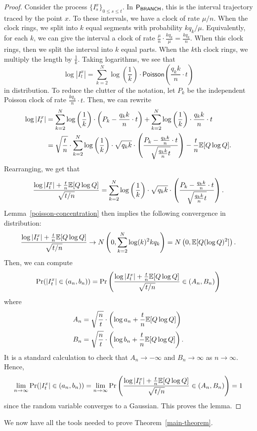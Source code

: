 \documentclass[12pt]{article}
\begin{document}
\begin{proof}
	Consider the process $\{I_s^x\}_{0 \leq s \leq t}$. In $\mathsf{P}_{\mathsf{BRANCH}}$, this is the interval trajectory traced by the point $x$. To these intervals, we have a clock of rate $\mu / n$. When the clock rings, we split into $k$ equal segments with probability $kq_k / \mu$. Equivalently, for each $k$, we can give the interval a clock of rate $\frac{\mu}{n} \cdot \frac{kq_k}{\mu} = \frac{kq_k}{n}$. When this clock rings, then we split the interval into $k$ equal parts. When the $k$th clock rings, we multiply the length by $\frac{1}{k}$. Taking logarithms, we see that 
	\[
		\log |I_t^x| = \sum_{k = 2}^N \log \left ( \frac{1}{k} \right ) \cdot \mathsf{Poisson} \left ( \frac{q_k k}{n} \cdot t \right )
	\]
	in distribution. To reduce the clutter of the notation, let $P_k$ be the independent Poisson clock of rate $\frac{k q_k}{n} \cdot t$. Then, we can rewrite 
	\begin{align*}
	\log |I_t^x| & = \sum_{k = 2}^N \log \left ( \frac{1}{k} \right ) \cdot \left ( P_k - \frac{q_k k}{n} \cdot t \right ) + \sum_{k = 2}^N \log \left ( \frac{1}{k} \right ) \cdot \frac{q_k k}{n} \cdot t	\\
	& = \sqrt{\frac{t}{n}} \cdot \sum_{k = 2}^N \log \left ( \frac{1}{k} \right ) \cdot \sqrt{q_k k} \cdot \left ( \frac{P_k - \frac{q_k k}{n} \cdot t}{\sqrt{\frac{q_k k}{n} t}} \right ) - \frac{t}{n} \mathbb{E}[Q \log Q].
\end{align*}
Rearranging, we get that 
\[
	\frac{\log |I_t^x| + \frac{t}{n} \mathbb{E}[Q \log Q]}{\sqrt{t/n}} = \sum_{k = 2}^N \log \left ( \frac{1}{k} \right ) \cdot \sqrt{q_k k} \cdot	\left ( \frac{P_k - \frac{q_k k}{n} \cdot t}{\sqrt{\frac{q_k k}{n} t}} \right ).
\]
Lemma~\ref{poisson-concentration} then implies the following convergence in distribution:
\[
	\frac{\log |I_t^x| + \frac{t}{n} \mathbb{E}[Q \log Q]}{\sqrt{t/n}} \to N \left (0, \sum_{k = 2}^N \log(k)^2 k q_k \right ) = N \left (0, \mathbb{E}[Q (\log Q)^2] \right ).
\]
Then, we can compute 
\[
	\Pr (|I_t^x| \in (a_n, b_n)) = \Pr \left ( \frac{\log |I_t^x| + \frac{t}{n} \mathbb{E}[Q \log Q]}{\sqrt{t/n}} \in (A_n, B_n) \right )
\]
where
\begin{align*}
	A_n & = \sqrt{\frac{n}{t}} \cdot \left ( \log a_n + \frac{t}{n} \mathbb{E}[Q \log Q] \right ) \\
	B_n & = \sqrt{\frac{n}{t}} \cdot \left ( \log b_n + \frac{t}{n} \mathbb{E}[Q \log Q] \right ).
\end{align*}
It is a standard calculation to check that $A_n \to -\infty$ and $B_n \to \infty$ as $n \to \infty$. Hence, 
\[
	\lim_{n \to \infty} \Pr (|I_t^x| \in (a_n, b_n)) = \lim_{n \to \infty} \Pr \left ( \frac{\log |I_t^x| + \frac{t}{n} \mathbb{E}[Q \log Q]}{\sqrt{t/n}} \in (A_n, B_n) \right ) = 1
\]
since the random variable converges to a Gaussian. This proves the lemma. 

\end{proof}
We now have all the tools needed to prove Theorem~\ref{main-theorem}. 
\end{document}
